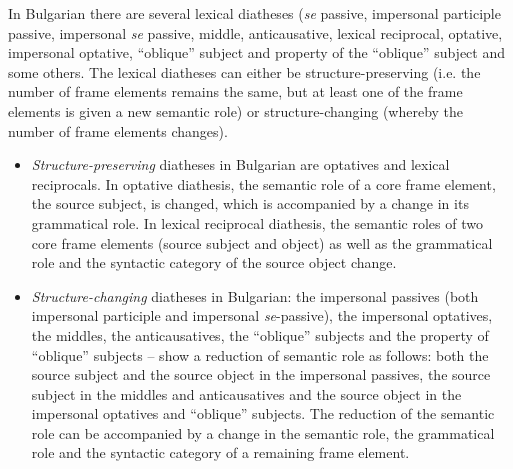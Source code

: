 \documentclass[output=paper,colorlinks,citecolor=brown]{langscibook}
\begin{document}
In Bulgarian there are several lexical diatheses (\textit{se} passive, impersonal participle passive, impersonal \textit{se} passive, middle, anticausative, lexical reciprocal, optative, impersonal optative, “oblique” subject and property of the “oblique” subject \citep[153--155]{Koeva2022} and some others. The lexical diatheses can either be structure-preserving (i.e. the number of frame elements remains the same, but at least one of the frame elements is given a new semantic role) or structure-changing (whereby the number of frame elements changes).

\begin{itemize}
\item  \emph{Structure-preserving} diatheses in Bulgarian are optatives and lexical reciprocals.  In optative diathesis, the semantic role  of a core frame element, the source subject, is changed, which is accompanied by a change in its grammatical role. In lexical reciprocal diathesis, the semantic roles of two core frame elements (source subject and object) as well as the grammatical role and the syntactic category of the source object change.

\item \emph{Structure-changing} diatheses in Bulgarian: the impersonal passives (both impersonal participle and  impersonal \textit{se}-passive), the impersonal optatives, the middles, the anticausatives, the “oblique” subjects and the property of “oblique” subjects -- show a reduction of semantic role as follows: both the source subject and the source object in the impersonal passives, the source subject in the middles and anticausatives and the source object in the impersonal optatives and “oblique” subjects. The reduction of the semantic role can be accompanied by a change in the semantic role, the grammatical role and the syntactic category of a remaining frame element. 

\end{itemize}
\end{document}
